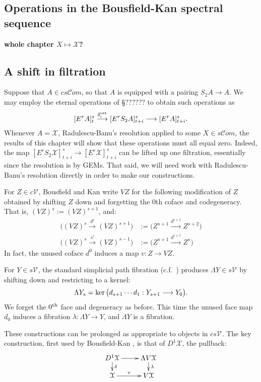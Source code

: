 \documentclass[11pt]{amsart}
\theoremstyle{plain}
\theoremstyle{definition}
\renewcommand{\ker}{\textup{ker}\,}
\renewcommand{\to}{\longrightarrow}
\newcommand{\scrC}{\mathscr{C}}
\newcommand{\calX}{\mathcal{X}}
\newcommand{\calV}{\mathcal{V}}
\theoremstyle{plain}
\newcommand{\vect}[2]{\calV^{#1}_{#2}}
\newcommand{\algs}{{\scrC\!\textit{om}}}
\newcommand{\E}[5]{[E^{#1}_{#2}#3]^{#4}_{#5}}
\begin{document}
\begin{Operations on the Bousfield-Kan spectral sequence}
\section{\textbf{Operations in the Bousfield-Kan spectral sequence}}\label{Operations on the Bousfield-Kan spectral sequence}
\textbf{whole chapter $X\mapsto \calX$?}
\subsection{A shift in filtration}
Suppose that $A\in cs\algs$, so that $A$ is equipped with a pairing $S_2A\to A$. We may employ the eternal operations of \S?????? to obtain such operations as
\[\E{r}{}{A}{s}{t}\overset{\delta_i^\textup{ext}}{\to} \E{r}{}{S_2A}{s}{t+i}\to \E{r}{}{A}{s}{t+i}.\]
Whenever $A=\calX$, Radulescu-Banu's resolution applied to some $X\in s\algs$, the results of this chapter will show that these operations must all equal zero. Indeed, the map $\E{r}{}{S_2\calX}{s}{t+i}\to \E{r}{}{\calX}{s}{t+i}$ can be lifted up one filtration, essentially since the resolution is by GEMs. That said, we will need work with  Radulescu-Banu's resolution directly in order to make our constructions.

For $Z\in c\vect{}{}$, Bousfield and Kan write  $VZ$ for the following modification of $Z$ obtained by shifting $Z$ down and forgetting the 0th coface and codegeneracy. That is, $(VZ)^s:=(VZ)^{s+1}$, and:
\begin{align*}
\bigl((VZ)^s\overset{d^i}{\to} (VZ)^{s+1}\bigr)&:=\bigl(Z^{s+1}\overset{d^{i+1}}{\to} Z^{s+2}\bigr)\\
\bigl((VZ)^s\overset{s^i}{\to} (VZ)^{s-1}\bigr)&:=\bigl(Z^{s+1}\overset{d^{i+1}}{\to} Z^{s}\bigr)
\end{align*}
In fact, the unused coface $d^0$ induces a map $v:Z\to VZ$.

For $Y\in s\vect{}{}$, the standard simplicial path fibration (c.f.\ \cite[p.82]{BousKanSSeq.pdf}) produces $\Lambda Y\in s\vect{}{}$ by shifting down and restricting to a kernel:
\[\Lambda Y_s=\ker\bigl(d_{s+1}\cdots d_1:Y_{s+1}\to Y_0\bigr).\]
We forget the $0^\textup{th}$ face and degeneracy as before. This time the unused face map $d_0$ induces a fibration $\lambda:\Lambda Y\to Y$, and $\Lambda Y$ is  a fibration.

These constructions can be prolonged as appropriate to objects in $cs\vect{}{}$. 
The key construction, first used by Bousfield-Kan \cite{BK_pairings_products.pdf,BK_pairings.pdf}, is that of $D^1\calX $, the pullback:
\[\xymatrix@R=4mm{
D^1\calX \ar[r]
\ar[d]^-{\delta}
&%
\Lambda V\calX \ar[d]^-{\lambda}
\\%
\calX \ar[r]^-{v}
&%
V\calX %
}\]


\end{Operations on the Bousfield-Kan spectral sequence}
\end{document}
